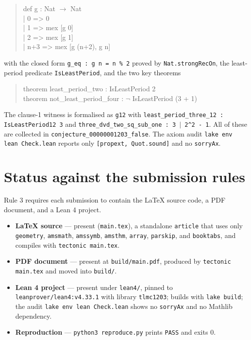 \documentclass[11pt]{article}
\theoremstyle{definition}
\theoremstyle{remark}
\begin{document}
\begin{quote}\ttfamily
def g : Nat $\to$ Nat\\
\hspace*{2em}| 0 => 0\\
\hspace*{2em}| 1 => mex [g 0]\\
\hspace*{2em}| 2 => mex [g 1]\\
\hspace*{2em}| n+3 => mex [g (n+2), g n]
\end{quote}

\noindent with the closed form \texttt{g\_eq : g n = n \% 2} proved by
\texttt{Nat.strongRecOn}, the least-period predicate \texttt{IsLeastPeriod},
and the two key theorems

\begin{quote}\ttfamily
theorem least\_period\_two : IsLeastPeriod 2\\
theorem not\_least\_period\_four : $\lnot$ IsLeastPeriod (3 + 1)
\end{quote}

\begin{sloppypar}
\noindent The clause-1 witness is formalised as \texttt{g12} with
\texttt{least\_period\_three\_12 : IsLeastPeriod12 3} and
\texttt{three\_dvd\_two\_sq\_sub\_one : 3 $\mid$ 2\textasciicircum2 - 1}. All of
these are collected in \texttt{conjecture\_00000001203\_false}. The axiom audit
\texttt{lake env lean Check.lean} reports only \texttt{[propext, Quot.sound]}
and no \texttt{sorryAx}.
\end{sloppypar}

\section{Status against the submission rules}

Rule 3 requires each submission to contain the LaTeX source code, a PDF
document, and a Lean 4 project.

\begin{itemize}
\item \textbf{LaTeX source} --- present (\texttt{main.tex}), a standalone
  \texttt{article} that uses only \texttt{geometry}, \texttt{amsmath},
  \texttt{amssymb}, \texttt{amsthm}, \texttt{array}, \texttt{parskip}, and
  \texttt{booktabs}, and compiles with \texttt{tectonic main.tex}.
\item \textbf{PDF document} --- present at \texttt{build/main.pdf}, produced by
  \texttt{tectonic main.tex} and moved into \texttt{build/}.
\item \textbf{Lean 4 project} --- present under \texttt{lean4/}, pinned to
  \texttt{leanprover/lean4:v4.33.1} with library \texttt{tlmc1203}; builds with
  \texttt{lake build}; the audit \texttt{lake env lean Check.lean} shows no
  \texttt{sorryAx} and no Mathlib dependency.
\item \textbf{Reproduction} --- \texttt{python3 reproduce.py} prints
  \texttt{PASS} and exits $0$.
\end{itemize}
\end{document}
